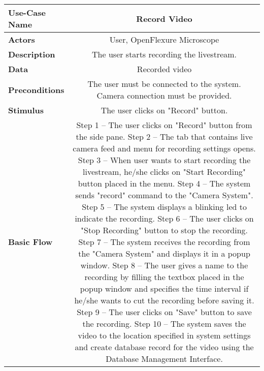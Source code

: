 \begin{table}[H]
     \centering
     \begin{tabular}{|l|C|}
         \hline
          \textbf{Use-Case Name} & Record Video \\
         \hline
          \textbf{Actors} & User, OpenFlexure Microscope \\ 
         \hline
          \textbf{Description} & The user starts recording the livestream. \\ 
         \hline
          \textbf{Data} & Recorded video\\ 
         \hline
          \textbf{Preconditions} & 
		  The user must be connected to the system. \newline
		  Camera connection must be provided. \\
         \hline
          \textbf{Stimulus} & The user clicks on "Record" button.\\ 
         \hline
          \textbf{Basic Flow} & 
          Step 1 -- The user clicks on "Record" button from the side pane. \newline
          Step 2 -- The tab that contains live camera feed and menu for recording settings opens. \newline
          Step 3 -- When user wants to start recording the livestream, he/she clicks on "Start Recording" button placed in the menu. \newline
          Step 4 -- The system sends "record" command to the "Camera System". \newline
          Step 5 -- The system displays a blinking led to indicate the recording. \newline
          Step 6 -- The user clicks on "Stop Recording" button to stop the recording. \newline
          Step 7 -- The system receives the recording from the "Camera System" and displays it in a popup window. \newline
          Step 8 -- The user gives a name to the recording by filling the textbox placed in the popup window and specifies the time interval if he/she wants to cut the recording before saving it. \newline
		  Step 9 -- The user clicks on "Save" button to save the recording. \newline
		  Step 10 -- The system saves the video to the location specified in system settings and create database record for the video using the Database Management Interface. \\
         \hline

\end{tabular}
\end{table}
